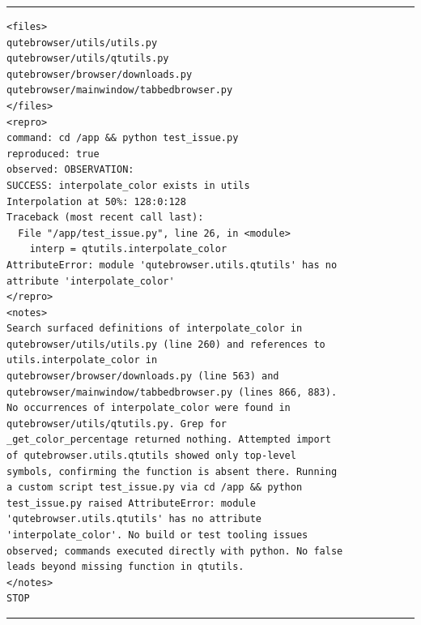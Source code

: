 \begin{minipage}{\linewidth}
\rule{\linewidth}{0.6pt}
\scriptsize
\begin{verbatim}
<files>
qutebrowser/utils/utils.py
qutebrowser/utils/qtutils.py
qutebrowser/browser/downloads.py
qutebrowser/mainwindow/tabbedbrowser.py
</files>
<repro>
command: cd /app && python test_issue.py
reproduced: true
observed: OBSERVATION:
SUCCESS: interpolate_color exists in utils
Interpolation at 50%: 128:0:128
Traceback (most recent call last):
  File "/app/test_issue.py", line 26, in <module>
    interp = qtutils.interpolate_color
AttributeError: module 'qutebrowser.utils.qtutils' has no
attribute 'interpolate_color'
</repro>
<notes>
Search surfaced definitions of interpolate_color in
qutebrowser/utils/utils.py (line 260) and references to
utils.interpolate_color in
qutebrowser/browser/downloads.py (line 563) and
qutebrowser/mainwindow/tabbedbrowser.py (lines 866, 883).
No occurrences of interpolate_color were found in
qutebrowser/utils/qtutils.py. Grep for
_get_color_percentage returned nothing. Attempted import
of qutebrowser.utils.qtutils showed only top-level
symbols, confirming the function is absent there. Running
a custom script test_issue.py via cd /app && python
test_issue.py raised AttributeError: module
'qutebrowser.utils.qtutils' has no attribute
'interpolate_color'. No build or test tooling issues
observed; commands executed directly with python. No false
leads beyond missing function in qtutils.
</notes>
STOP
\end{verbatim}
\vspace{-6pt}
\rule{\linewidth}{0.6pt}
\end{minipage}
